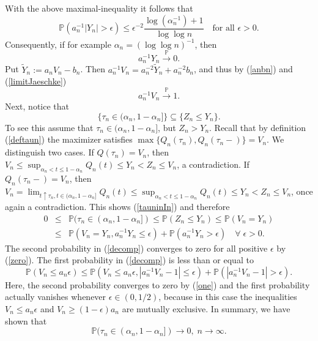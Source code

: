\documentclass[sn-mathphys,Numbered]{sn-jnl}%
\theoremstyle{thmstyleone}%
\theoremstyle{thmstyletwo}%
\theoremstyle{thmstylethree}%
\begin{document}
With the above maximal-inequality it follows that
$$
\mathbb{P}(a_n^{-1}|Y_n|>\epsilon)\le \epsilon^{-2} \frac{\log(\alpha_n^{-1})+1}{\log\log n} \quad \text{for all } \epsilon>0.
$$
Consequently, if for example $\alpha_n= (\log \log n)^{-1}$, then
\begin{equation} \label{zero}
 a_n^{-1} Y_n \stackrel{\mathbb{P}}{\rightarrow} 0.
\end{equation}
Put $\tilde{Y}_n:=a_n V_n-b_n$. Then $a_n^{-1} V_n= a_n^{-2}\tilde{Y}_n+ a_n^{-2} b_n$, and thus by (\ref{anbn}) and (\ref{limitJaeschke})
\begin{equation} \label{one}
 a_n^{-1} V_n \stackrel{\mathbb{P}}{\rightarrow} 1.
\end{equation}
Next, notice that
\begin{equation} \label{tauninIn}
\{\tau_n \in (\alpha_n,1-\alpha_n]\} \subseteq \{Z_n \le Y_n\}.
\end{equation}
To see this assume that $\tau_n \in (\alpha_n,1-\alpha_n]$, but $Z_n>Y_n$. Recall that by definition (\ref{deftaun}) the maximizer satisfies $\max\{Q_n(\tau_n),Q_n(\tau_n-)\}=V_n.$ We distinguish two cases. If $Q(\tau_n)=V_n$, then $V_n \le \sup_{\alpha_n< t \le 1-\alpha_n} Q_n(t) \le Y_n <Z_n \le V_n$, a contradiction. If $Q_n(\tau_n-)=V_n$, then $V_n = \lim_{t \uparrow \tau_n, t \in (\alpha_n,1-\alpha_n]} Q_n(t) \le \sup_{\alpha_n< t \le 1-\alpha_n} Q_n(t) \le Y_n <Z_n \le V_n$, once again a contradiction. This shows (\ref{tauninIn}) and therefore
\begin{eqnarray}
0&\le& \mathbb{P}(\tau_n \in (\alpha_n,1-\alpha_n]) \le \mathbb{P}(Z_n \le Y_n) \le \mathbb{P}(V_n=Y_n) \nonumber\\
 &\le& \mathbb{P}(V_n=Y_n, a_n^{-1} Y_n \le \epsilon)+\mathbb{P}(a_n^{-1} Y_n > \epsilon) \quad \forall \; \epsilon>0. \label{decomp}
\end{eqnarray}
The second probability in (\ref{decomp}) converges to zero for all positive $\epsilon$ by (\ref{zero}). The first probability in (\ref{decomp})
is less than or equal to
$$
 \mathbb{P}(V_n \le a_n \epsilon) \le \mathbb{P}(V_n \le a_n \epsilon, |a_n^{-1} V_n-1|\le \epsilon)+\mathbb{P}(|a_n^{-1} V_n-1| > \epsilon).
$$
Here, the second probability converges to zero by (\ref{one}) and the first probability actually vanishes whenever $\epsilon \in (0,1/2)$, because in this case the inequalities $V_n \le a_n \epsilon$ and $V_n \ge (1-\epsilon)a_n$ are mutually exclusive.
In summary, we have shown that
\begin{equation} \label{probtauninIn}
 \mathbb{P}(\tau_n \in (\alpha_n,1-\alpha_n]) \rightarrow 0, \; n \rightarrow \infty.
\end{equation}
\end{document}
